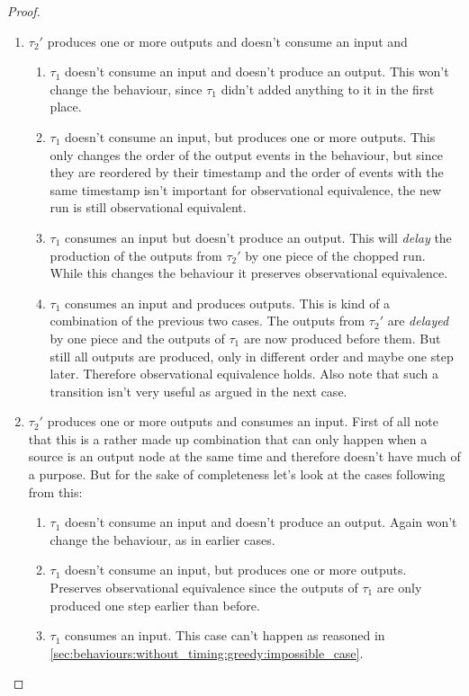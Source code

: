 \begin{proof}
\begin{enumerate}
      \item \(\tau_2'\) produces one or more outputs and doesn't consume an input and
        \begin{enumerate}
          \item \(\tau_1\) doesn't consume an input and doesn't produce an output. This won't change the behaviour, since \(\tau_1\) didn't added anything to it in the first place.
          \item \(\tau_1\) doesn't consume an input, but produces one or more outputs. This only changes the order of the output events in the behaviour, but since they are reordered by their timestamp and the order of events with the same timestamp isn't important for observational equivalence, the new run is still observational equivalent.
          \item \(\tau_1\) consumes an input but doesn't produce an output. This will \emph{delay} the production of the outputs from \(\tau_2'\) by one piece of the chopped run. While this changes the behaviour it preserves observational equivalence.
          \item \(\tau_1\) consumes an input and produces outputs. This is kind of a combination of the previous two cases. The outputs from \(\tau_2'\) are \emph{delayed} by one piece and the outputs of \(\tau_1\) are now produced before them. But still all outputs are produced, only in different order and maybe one step later. Therefore observational equivalence holds. Also note that such a transition isn't very useful as argued in the next case.
        \end{enumerate}
      \item \(\tau_2'\) produces one or more outputs and consumes an input. First of all note that this is a rather made up combination that can only happen when a source is an output node at the same time and therefore doesn't have much of a purpose. But for the sake of completeness let's look at the cases following from this:
        \begin{enumerate}
          \item \(\tau_1\) doesn't consume an input and doesn't produce an output. Again won't change the behaviour, as in earlier cases.
          \item\label{sec:behaviours:without_timing:greedy:non_greedy_2} \(\tau_1\) doesn't consume an input, but produces one or more outputs. Preserves observational equivalence since the outputs of \(\tau_1\) are only produced one step earlier than before.
          \item \(\tau_1\) consumes an input. This case can't happen as reasoned in \cref{sec:behaviours:without_timing:greedy:impossible_case}.
        \end{enumerate}
    \end{enumerate}


\end{proof}
